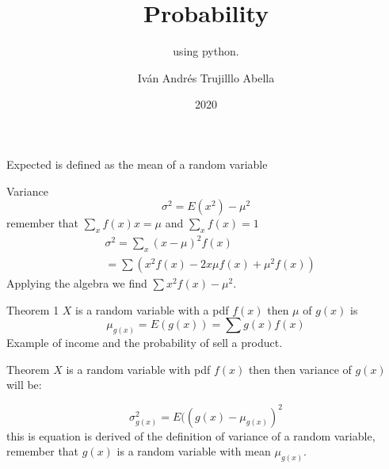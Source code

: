 \documentclass{beamer}
\institute{Javeriana}
\date{2020}
\title[Pontificia Universidad Javeriana] %
{Probability}
\subtitle{ using python.}
\author[
Iván Andrés Trujillo

] 
{
Iván Andrés Trujilllo Abella}
\institute[] 
{
  Facultad de Ingenieria\\
  Pontificia Universidad Javeriana
  \and
  
\textbf{}
}
\date[MINTA] %
\begin{document}
\frame{\titlepage}


\begin{frame}{Expected }
is defined as the mean of a random variable
\end{frame}


\begin{frame}{Variance}
\begin{equation}
\sigma^{2}  = E(x^{2}) - \mu^{2}
\end{equation}
remember that $\sum_{x}f(x)x = \mu$  and $\sum_{x} f(x) = 1 $
\begin{equation}
\begin{align*}
& \sigma^{2} = \sum_{x} (x - \mu)^{2}f(x)  \\
& = \sum(x^{2}f(x) - 2x\mu f(x) + \mu^{2}f(x))
\end{align*}
\end{equation}
Applying the algebra we find $\sum x^{2}f(x)-\mu^{2}$.

\end{frame}







\begin{frame}{Theorem 1}
$X$ is a random variable with a pdf $f(x)$ then $\mu$ of $g(x)$ is 
\begin{equation}
\mu_{g(x)} = E(g(x)) = \sum g(x)f(x)
\end{equation}
Example of income and the probability of sell a product.

\end{frame}



\begin{frame}{Theorem}
$X$ is a random variable with pdf $f(x)$ then then variance of $g(x)$ will be:

\begin{equation}
\sigma^{2}_{g(x)} = E( (g(x) - \mu_{g(x)})^{2}
\end{equation}
this is equation is derived of the definition of variance of a random variable, remember that $g(x)$ is a random variable with mean $\mu_{g(x)}$.
\end{frame}
\end{document}
